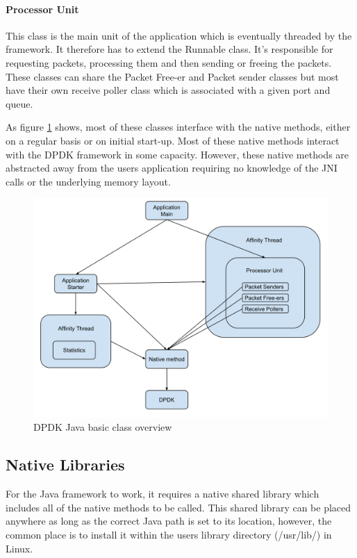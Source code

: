 \documentclass[final_report.tex]{subfiles}
\begin{document}
\paragraph*{Processor Unit} This class is the main unit of the application which is eventually threaded by the framework. It therefore has to extend the Runnable class. It's responsible for requesting packets, processing them and then sending or freeing the packets. These classes can share the Packet Free-er and Packet sender classes but most have their own receive poller class which is associated with a given port and queue.

As figure \ref{fig:overview} shows, most of these classes interface with the native methods, either on a regular basis or on initial start-up. Most of these native methods interact with the DPDK framework in some capacity. However, these native methods are abstracted away from the users application requiring no knowledge of the JNI calls or the underlying memory layout.

\begin{figure}[H]
	\centering
	\includegraphics[width=\textwidth]{img/app.png}
	\caption{DPDK Java basic class overview}
	\label{fig:overview}
\end{figure}

\subsection{Native Libraries}
For the Java framework to work, it requires a native shared library which includes all of the native methods to be called. This shared library can be placed anywhere as long as the correct Java path is set to its location, however, the common place is to install it within the users library directory (/usr/lib/) in Linux.
\end{document}

